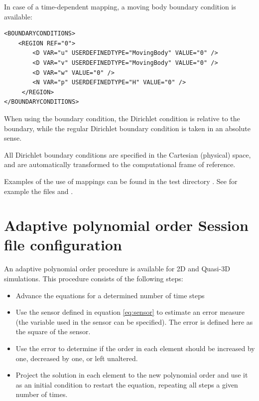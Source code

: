 In case of a time-dependent mapping, a moving body boundary condition
is available: 
\begin{lstlisting}[style=XMLStyle]
<BOUNDARYCONDITIONS>
    <REGION REF="0">
        <D VAR="u" USERDEFINEDTYPE="MovingBody" VALUE="0" />
        <D VAR="v" USERDEFINEDTYPE="MovingBody" VALUE="0" />
        <D VAR="w" VALUE="0" />
        <N VAR="p" USERDEFINEDTYPE="H" VALUE="0" />
     </REGION>
</BOUNDARYCONDITIONS>
\end{lstlisting}
When using the  boundary condition, the Dirichlet condition
is relative to the boundary, while the regular Dirichlet boundary condition
is taken in an absolute sense. 

All Dirichlet boundary conditions are specified in the Cartesian (physical) space,
 and are automatically transformed to the computational frame of reference. 
 
\begin{notebox}
Examples of the use of mappings can be found in the test directory
. See for example the files
 and .
\end{notebox}

\section{Adaptive polynomial order Session file configuration}
\label{SectionDriverAdaptive}

An adaptive polynomial order procedure is available for 2D and
Quasi-3D simulations.  This procedure consists of the following steps:
\begin{itemize}
\item Advance the equations for a determined number of time steps
\item Use the sensor defined in equation \ref{eq:sensor} to 
estimate an error measure (the variable used in the sensor can be specified).
 The error is defined here as the square of the sensor.  
\item Use the error to determine if the order in each element should be
increased by one, decreased by one, or left unaltered.
\item Project the solution in each element to the new polynomial order and use it as an
initial condition to restart the equation, repeating all steps a given number of times.
\end{itemize}

